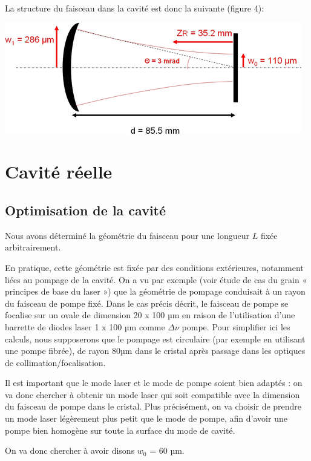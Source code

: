 \documentclass{book}
\begin{document}
La structure du faisceau dans la cavité est donc la suivante (figure 4):

{\centering
\includegraphics[scale=1.7]{images/EC_Fig4.jpg}
\par}

\section{Cavité réelle}
\subsection{Optimisation de la cavité}


Nous avons déterminé la géométrie du faisceau pour une longueur \(L\) fixée arbitrairement.

En pratique, cette géométrie est fixée par des conditions extérieures, notamment liées au pompage de la cavité. On a vu par exemple (voir étude de cas du grain « principes de base du laser ») que la géométrie de pompage conduisait à un rayon du faisceau de pompe fixé. Dans le cas précis décrit, le faisceau de pompe se focalise sur un ovale de dimension 20 x 100 µm en raison de l'utilisation d'une barrette de diodes laser 1 x 100 µm comme \(\Delta \nu\) pompe. Pour simplifier ici les calculs, nous supposerons que le pompage est circulaire (par exemple en utilisant une pompe fibrée), de rayon 80µm dans le cristal après passage dans les optiques de collimation/focalisation.

Il est important que le mode laser et le mode de pompe soient bien adaptés : on va donc chercher à obtenir un mode laser qui soit compatible avec la dimension du faisceau de pompe dans le cristal. Plus précisément, on va choisir de prendre un mode laser légèrement plus petit que le mode de pompe, afin d'avoir une pompe bien homogène sur toute la surface du mode de cavité.

On va donc chercher à avoir disons \(w_0\) = 60 µm.
\end{document}
